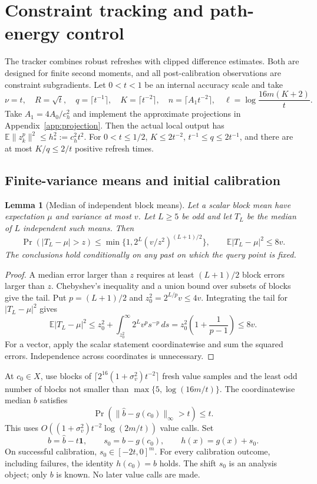 \documentclass[11pt,a4paper]{article}
\newcommand{\E}{\mathbb E}
\newtheorem{lemma}[theorem]{Lemma}
\theoremstyle{remark}
\numberwithin{equation}{section}
\begin{document}
\section{Constraint tracking and path-energy control}\label{sec:tracking}
The tracker combines robust refreshes with clipped difference estimates. Both are designed for finite second moments, and all post-calibration observations are constraint subgradients. Let $0<t<1$ be an internal accuracy scale and take
\begin{equation}
 \nu=t,\quad R=\sqrt t,\quad q=\lceil t^{-1}\rceil,
 \quad K=\lceil t^{-2}\rceil,
 \quad n=\lceil A_1t^{-2}\rceil,
 \quad \ell=\log\frac{16m(K+2)}t.
 \label{eq:parameters}
\end{equation}
Take $A_1=4A_0/c_h^2$ and implement the approximate projections in Appendix~\ref{app:projection}. Then the actual local output has $\E\|z_k^p\|^2\le h_*^2:=c_h^2t^2$. For $0<t\le1/2$,
$K\le2t^{-2}$, $t^{-1}\le q\le2t^{-1}$, and there are at most $K/q\le2/t$ positive refresh times.

\subsection{Finite-variance means and initial calibration}
\begin{lemma}[Median of independent block means]\label{lem:mom}
Let a scalar block mean have expectation $\mu$ and variance at most $v$. Let $L\ge5$ be odd and let $T_L$ be the median of $L$ independent such means. Then
\[
 \Pr(|T_L-\mu|>z)
 \le \min\{1,2^L(v/z^2)^{(L+1)/2}\},\qquad
 \E|T_L-\mu|^2\le8v.
\]
The conclusions hold conditionally on any past on which the query point is fixed.
\end{lemma}
\begin{proof}
A median error larger than $z$ requires at least $(L+1)/2$ block errors larger than $z$. Chebyshev's inequality and a union bound over subsets of blocks give the tail. Put $p=(L+1)/2$ and $z_0^2=2^{L/p}v\le4v$. Integrating the tail for $|T_L-\mu|^2$ gives
\[
 \E|T_L-\mu|^2\le z_0^2+\int_{z_0^2}^\infty2^Lv^ps^{-p}\,ds
 =z_0^2\left(1+\frac1{p-1}\right)\le8v.
\]
For a vector, apply the scalar statement coordinatewise and sum the squared errors. Independence across coordinates is unnecessary.
\end{proof}

At $c_0\in X$, use blocks of
$\lceil2^{16}(1+\sigma_v^2)t^{-2}\rceil$ fresh value samples and the least odd number of blocks not smaller than $\max\{5,\log(16m/t)\}$. The coordinatewise median $\widehat b$ satisfies
\[
 \Pr(\|\widehat b-g(c_0)\|_\infty>t)\le t.
\]
This uses $O((1+\sigma_v^2)t^{-2}\log(2m/t))$ value calls. Set
\[
 b=\widehat b-t\mathbf1,\qquad s_0=b-g(c_0),\qquad h(x)=g(x)+s_0.
\]
On successful calibration, $s_0\in[-2t,0]^m$. For every calibration outcome, including failures, the identity $h(c_0)=b$ holds. The shift $s_0$ is an analysis object; only $b$ is known. No later value calls are made.
\end{document}

